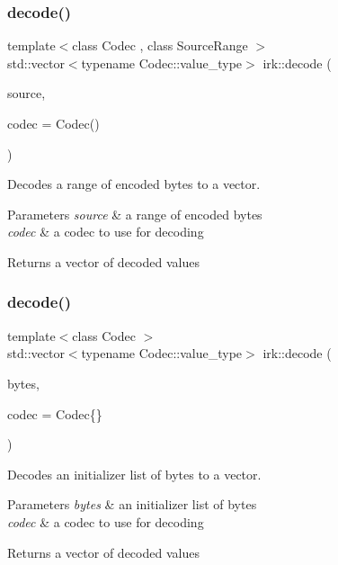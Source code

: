 \subsubsection{\texorpdfstring{decode()}{decode()}\hspace{0.1cm}{\footnotesize\ttfamily [2/3]}}
{\footnotesize\ttfamily template$<$class Codec , class Source\+Range $>$ \\
std\+::vector$<$typename Codec\+::value\+\_\+type$>$ irk\+::decode (\begin{DoxyParamCaption}\item[{const Source\+Range \&}]{source,  }\item[{const Codec \&}]{codec = {\ttfamily Codec()} }\end{DoxyParamCaption})}



Decodes a range of encoded bytes to a vector. 


\begin{DoxyParams}{Parameters}
{\em source} & a range of encoded bytes \\
\hline
{\em codec} & a codec to use for decoding \\
\hline
\end{DoxyParams}
\begin{DoxyReturn}{Returns}
a vector of decoded values 
\end{DoxyReturn}
\mbox{\label{namespaceirk_a939f0cf6fd86def4ef2d1035d61ff789}} 
\subsubsection{\texorpdfstring{decode()}{decode()}\hspace{0.1cm}{\footnotesize\ttfamily [3/3]}}
{\footnotesize\ttfamily template$<$class Codec $>$ \\
std\+::vector$<$typename Codec\+::value\+\_\+type$>$ irk\+::decode (\begin{DoxyParamCaption}\item[{std\+::initializer\+\_\+list$<$ char $>$}]{bytes,  }\item[{const Codec \&}]{codec = {\ttfamily Codec\{\}} }\end{DoxyParamCaption})}



Decodes an initializer list of bytes to a vector. 


\begin{DoxyParams}{Parameters}
{\em bytes} & an initializer list of bytes \\
\hline
{\em codec} & a codec to use for decoding \\
\hline
\end{DoxyParams}
\begin{DoxyReturn}{Returns}
a vector of decoded values 
\end{DoxyReturn}
\mbox{\label{namespaceirk_a9e83666a824362c954771e5fc6a4e0df}} 
